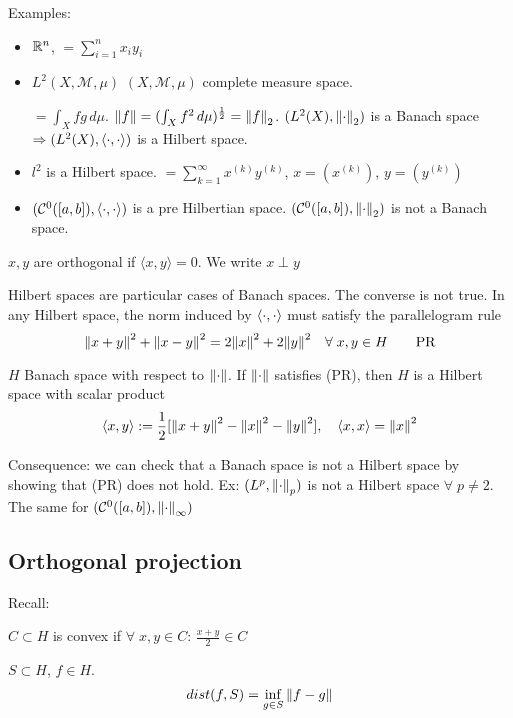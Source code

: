 Examples:
\begin{itemize}
    \item \(\mathbb{R}^n\), \(<x, y> = \sum_{i=1}^n x_i y_i\)
    \item \(L^2(X, \mathcal{M}, \mu)\) \((X, \mathcal{M}, \mu)\) complete measure space. 
    
    \(<f, g> = \int_X fg \, d\mu\). \(\norm{f} = (\int_X f^2 \, d\mu)^\frac{1}{2} = \norm{f}_2\). \((L^2(X), \norm{\cdot}_2)\) is a Banach space \(\Rightarrow (L^2(X), \langle \cdot,\cdot \rangle)\) is a Hilbert space.
    \item \(l^2\) is a Hilbert space. \(<x, y> = \sum_{k=1}^\infty x^{(k)} y^{(k)}\), \(x = (x^{(k)})\), \(y = (y^{(k)})\)
    \item \((\mathcal{C}^0([a, b]), \langle \cdot,\cdot \rangle )\) is a pre Hilbertian space. \((\mathcal{C}^0([a, b]), \norm{\cdot}_2 )\) is not a Banach space. 
\end{itemize}

\begin{definition}
    \(x, y\) are orthogonal if \(\langle x, y \rangle=0\). We write \(x \perp y\)
\end{definition}
\begin{remark}
    Hilbert spaces are particular cases of Banach spaces. The converse is not true. In any Hilbert space, the norm induced by \(\langle \cdot,\cdot \rangle\) must satisfy the parallelogram rule
    \[
        \norm{x+y}^2 + \norm{x-y}^2 = 2\norm{x}^2 + 2\norm{y}^2 \quad \forall \; x, y \in H \tag*{PR}
    \]
\end{remark}

\begin{proposition}
    \(H\) Banach space with respect to \(\norm{\cdot}\). If \(\norm{\cdot}\) satisfies (PR), then \(H\) is a Hilbert space with scalar product 
    \[
        \langle x, y \rangle := \frac{1}{2} [\norm{x+y}^2 - \norm{x}^2 - \norm{y}^2], \quad \langle x,x \rangle = \norm{x}^2
    \]
\end{proposition}

Consequence: we can check that a Banach space is not a Hilbert space by showing that (PR) does not hold.
Ex: \((L^p, \norm{\cdot}_p)\) is not a Hilbert space \(\forall\; p \neq 2\). The same for \((\mathcal{C}^0([a, b]), \norm{\cdot}_\infty )\)

\subsection*{Orthogonal projection}

Recall:
\begin{definition}
    \(C \subset H \) is convex if \(\forall\; x, y \in C: \, \frac{x+y}{2} \in C\)
\end{definition}
\begin{definition}
    \(S \subset H\), \(f \in H\). \[ dist (f, S) = \inf_{g \in S} \norm{f-g}\]
\end{definition}

